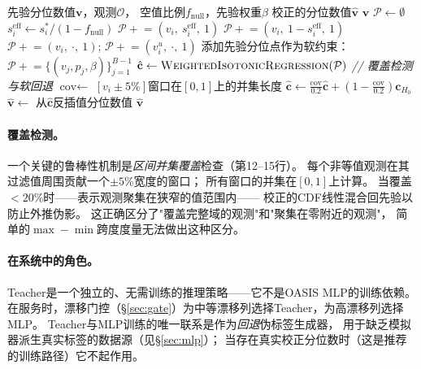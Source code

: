 \documentclass[runningheads]{llncs}
\begin{document}
\begin{algorithm}[t]
\caption{Teacher直方图校正}
\label{alg:teacher}
\begin{algorithmic}[1]
\Require 先验分位数值$\mathbf{v}$，观测$\mathcal{O}$，
         空值比例$f_{\text{null}}$，先验权重$\beta$
\Ensure 校正的分位数值$\hat{\mathbf{v}}$
 \Return $\mathbf{v}$ \EndIf
\State $\mathcal{P} \leftarrow \emptyset$
  \State $s_i^{\text{eff}} \leftarrow s^*_i / (1 - f_{\text{null}})$
    $\mathcal{P} \mathrel{+}= (v_i,\ s_i^{\text{eff}},\ 1)$
    $\mathcal{P} \mathrel{+}= (v_i,\ 1 - s_i^{\text{eff}},\ 1)$
    $\mathcal{P} \mathrel{+}= (v_i,\ \cdot,\ 1)$;
    $\mathcal{P} \mathrel{+}= (v_i^u,\ \cdot,\ 1)$
  \EndIf
\EndFor
\State 添加先验分位点作为软约束：
  $\mathcal{P} \mathrel{+}= \{(v_j, p_j, \beta)\}_{j=1}^{B-1}$
\State $\hat{\mathbf{c}} \leftarrow \textsc{WeightedIsotonicRegression}(\mathcal{P})$
\State \textit{// 覆盖检测与软回退}
\State $\text{cov} \leftarrow$ $[v_i{\pm}5\%]$窗口在$[0,1]$上的并集长度
  \State $\hat{\mathbf{c}} \leftarrow \frac{\text{cov}}{0.2}\hat{\mathbf{c}}
         + \!\left(1 - \frac{\text{cov}}{0.2}\right)\mathbf{c}_{H_0}$
\EndIf
\State $\hat{\mathbf{v}} \leftarrow$ 从$\hat{\mathbf{c}}$反插值分位数值
\State \Return $\hat{\mathbf{v}}$
\end{algorithmic}
\end{algorithm}

\paragraph{覆盖检测。}
一个关键的鲁棒性机制是\emph{区间并集覆盖}检查（第12--15行）。
每个非等值观测在其过滤值周围贡献一个${\pm}5\%$宽度的窗口；
所有窗口的并集在$[0,1]$上计算。
当覆盖$< 20\%$时——表示观测聚集在狭窄的值范围内——
校正的CDF线性混合回先验以防止外推伪影。
这正确区分了"覆盖完整域的观测"和"聚集在零附近的观测"，
简单的$\max{-}\min$跨度度量无法做出这种区分。

\paragraph{在系统中的角色。}
Teacher是一个独立的、无需训练的推理策略——它不是OASIS MLP的训练依赖。
在服务时，漂移门控（\S\ref{sec:gate}）为中等漂移列选择Teacher，为高漂移列选择MLP。
Teacher与MLP训练的唯一联系是作为\emph{回退}伪标签生成器，
用于缺乏模拟器派生真实标签的数据源（见\S\ref{sec:mlp}）；
当存在真实校正分位数时（这是推荐的训练路径）它不起作用。
\end{document}
